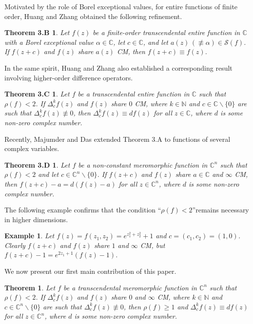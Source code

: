 \documentclass[11pt,reqno]{amsart}
\newtheorem*{theo3B}{Theorem 3.B}
\newtheorem*{theo3C}{Theorem 3.C}
\newtheorem*{theo3D}{Theorem 3.D}
\newtheorem{theo}{Theorem}[section]
\newtheorem{exm}{Example}[section]
\numberwithin{equation}{section}
\begin{document}
Motivated by the role of Borel exceptional values, for entire functions of finite order, Huang and Zhang \cite{Huang-Zhang-2018} obtained the following refinement. 
\begin{theo3B}\cite[Theorem 2.3]{Huang-Zhang-2018} Let $f(z)$ be a finite-order transcendental entire function in $\mathbb{C}$ with a Borel exceptional value $\alpha \in \mathbb{C}$, let $c \in \mathbb{C}$, and let $a(z) \,(\not\equiv \alpha) \in \mathcal{S}(f)$.
If $f(z+c)$ and $f(z)$ share $a(z)$ CM, then $f(z+c) \equiv f(z)$.
\end{theo3B}

In the same spirit, Huang and Zhang also established a corresponding result involving higher-order difference operators.
\begin{theo3C}\cite[Theorem 2.6.]{Huang-Zhang-2018} Let $f$ be a transcendental entire function in $\mathbb{C}$ such that $\rho(f)<2$.
If $\Delta_c^{k} f(z)$ and $f(z)$ share $0$ CM, where $k \in \mathbb{N}$ and
$c\in\mathbb{C}\backslash \{0\}$ are such that $\Delta_c^{k} f(z) \not\equiv 0$, then 
$\Delta_c^{k} f(z) \equiv df(z)$ for all $z\in\mathbb{C}$, where $d$ is some non-zero complex number.
\end{theo3C}

Recently, Majumder and Das \cite{MD1} extended Theorem 3.A to functions of several complex variables.
\begin{theo3D}\cite[Thorem 1.4]{MD1} Let $f$ be a non-constant meromorphic function in $\mathbb{C}^n$ such that $\rho(f)<2$ and let $c\in\mathbb{C}^n\backslash \{0\}$. If $f(z+c)$ and $f(z)$ share $a\in\mathbb{C}$ and $\infty$ CM, then $f(z+c)-a=d(f(z)-a)$ for all $z\in\mathbb{C}^n$, where $d$ is some non-zero complex number.
\end{theo3D}

The following example confirms that the condition ``$\rho(f)<2$''remains necessary in higher dimensions.
\begin{exm}\cite{MD1}
Let $f(z)=f(z_1,z_2)=e^{z_1^2+z_2^2}+1$ and $c=(c_1,c_2)=(1,0)$. Clearly $f(z+c)$ and $f(z)$ share $1$ and $\infty$ CM, but $f(z+c)-1=e^{2z_1+1}(f(z)-1)$.
\end{exm}

We now present our first main contribution of this paper.
\begin{theo}\label{t2.2} Let $f$ be a transcendental meromorphic function in $\mathbb{C}^n$ such that $\rho(f)<2$.
If $\Delta_c^{k} f(z)$ and $f(z)$ share $0$ and $\infty$ CM, where $k \in \mathbb{N}$ and
$c\in\mathbb{C}^n \backslash \{0\}$ are such that $\Delta_c^{k} f(z) \not\equiv 0$, then $\rho(f)\geq 1$ and
$\Delta_c^{k} f(z) \equiv df(z)$ for all $z\in\mathbb{C}^n$, where $d$ is some non-zero complex number.
\end{theo}
\end{document}
